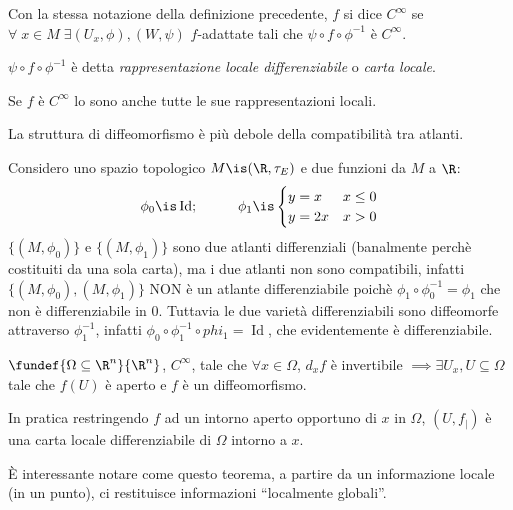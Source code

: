 \begin{defn}[$C^\infty$]
Con la stessa notazione della definizione precedente, $f$ si dice \emph{$C^\infty$} se
$\forall \; x \in M \;  \exists (U_x,\phi), (W,\psi)$ $f$-adattate tali che $\psi \circ f \circ \phi^{-1}$ è $C^\infty$.

$\psi \circ f \circ \phi^{-1}$ è detta \emph{rappresentazione locale differenziabile} o \emph{carta locale}.
\end{defn}

\begin{prop}
Se $f$ è $C^\infty$ lo sono anche tutte le sue rappresentazioni locali.
\end{prop}

\begin{oss}
La struttura di diffeomorfismo è più debole della compatibilità tra atlanti.
\end{oss}

\begin{es}
Considero uno spazio topologico $M \is (\R,\tau_E)$ e due funzioni da $M$ a $\R$:
\begin{equation*}
\phi_0\is \operatorname{Id} ;\hspace{1cm} \phi_1\is\begin{cases}y=x & x\le 0 \\ y=2x & x>0 \end{cases}
\end{equation*}
$\{(M,\phi_0)\}$ e $\{(M,\phi_1)\}$ sono due atlanti differenziali (banalmente perchè costituiti da una sola carta), ma i due atlanti non sono compatibili, infatti $\{(M,\phi_0),(M,\phi_1)\}$ NON è un atlante differenziabile poichè $\phi_1 \circ \phi_0^{-1} = \phi_1$ che non è differenziabile in 0.
Tuttavia le due varietà differenziabili sono diffeomorfe attraverso $\phi_1^{-1}$, infatti $\phi_0 \circ \phi_1^{-1} \circ phi_1 = \operatorname{Id}$, che evidentemente è differenziabile.
\end{es}

\begin{oss}
\end{oss}

\begin{teo}
$\fundef{\Omega \subseteq \R^n}{\R^n}$, $C^\infty$, tale che $\forall x \in \Omega$, $d_xf$ è invertibile $\implies \exists U_x, U\subseteq \Omega$ tale che $f(U)$ è aperto e $f$ è un diffeomorfismo.
\end{teo}

\begin{oss}
In pratica restringendo $f$ ad un intorno aperto opportuno di $x$ in $\Omega$, $(U,f_|)$ è una carta locale differenziabile di $\Omega$ intorno a $x$.

È interessante notare come questo teorema, a partire da un informazione locale (in un punto), ci restituisce informazioni ``localmente globali''.
\end{oss}

